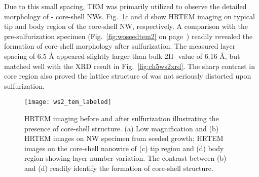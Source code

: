 Due to this small spacing, TEM was primarily utilized to observe the detailed morphology of - core-shell NWs. Fig.~\ref{fig:ch5ws2tem1}c and d show HRTEM imaging on typical tip and body region of the core-shell NW, respectively. A comparison with the pre-sulfurization specimen (Fig.~\ref{fig:woseedtem2} on page~\pageref{fig:woseedtem2}) readily revealed the formation of core-shell morphology after sulfurization. The measured layer spacing of 6.5 \si{\angstrom} appeared slightly larger than bulk 2H- value of 6.16 \si{\angstrom}, but matched well with the XRD result in Fig.~\ref{fig:ch5ws2xrd}. The sharp contrast in core region also proved the lattice structure of  was not seriously distorted upon sulfurization.
\begin{figure}[htb]
\centering
\texttt{[image: ws2\_tem\_labeled]}
\caption[HRTEM imaging before and after sulfurization]{HRTEM imaging before and after sulfurization illustrating the presence of core-shell structure. (a) Low magnification and (b) HRTEM images on  NW specimen from seeded growth;  HRTEM images on the core-shell nanowire of (c) tip region and (d) body region showing layer number variation. The contrast between (b) and (d) readily identify the formation of core-shell structure. }
\label{fig:ch5ws2tem1}
\end{figure}

